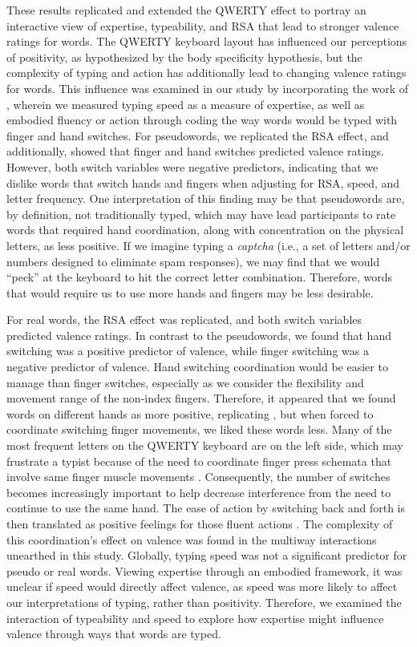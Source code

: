 \documentclass[english,man,man,mask]{apa6}
\theoremstyle{definition}
\theoremstyle{definition}
\theoremstyle{definition}
\theoremstyle{remark}
\begin{document}
These results replicated and extended the QWERTY effect to portray an
interactive view of expertise, typeability, and RSA that lead to
stronger valence ratings for words. The QWERTY keyboard layout has
influenced our perceptions of positivity, as hypothesized by the body
specificity hypothesis, but the complexity of typing and action has
additionally lead to changing valence ratings for words. This influence
was examined in our study by incorporating the work of
\textcite{Beilock2007}, wherein we measured typing speed as a measure of
expertise, as well as embodied fluency or action through coding the way
words would be typed with finger and hand switches. For pseudowords, we
replicated the RSA effect, and additionally, showed that finger and hand
switches predicted valence ratings. However, both switch variables were
negative predictors, indicating that we dislike words that switch hands
and fingers when adjusting for RSA, speed, and letter frequency. One
interpretation of this finding may be that pseudowords are, by
definition, not traditionally typed, which may have lead participants to
rate words that required hand coordination, along with concentration on
the physical letters, as less positive. If we imagine typing a
\emph{captcha} (i.e., a set of letters and/or numbers designed to
eliminate spam responses), we may find that we would \enquote{peck} at
the keyboard to hit the correct letter combination. Therefore, words
that would require us to use more hands and fingers may be less
desirable.

For real words, the RSA effect was replicated, and both switch variables
predicted valence ratings. In contrast to the pseudowords, we found that
hand switching was a positive predictor of valence, while finger
switching was a negative predictor of valence. Hand switching
coordination would be easier to manage than finger switches, especially
as we consider the flexibility and movement range of the non-index
fingers. Therefore, it appeared that we found words on different hands
as more positive, replicating \textcite{Beilock2007}, but when forced to
coordinate switching finger movements, we liked these words less. Many
of the most frequent letters on the QWERTY keyboard are on the left
side, which may frustrate a typist because of the need to coordinate
finger press schemata that involve same finger muscle movements
\autocite{Rumelhart1982}. Consequently, the number of switches becomes
increasingly important to help decrease interference from the need to
continue to use the same hand. The ease of action by switching back and
forth is then translated as positive feelings for those fluent actions
\autocite{Oppenheimer2008}. The complexity of this coordination's effect
on valence was found in the multiway interactions unearthed in this
study. Globally, typing speed was not a significant predictor for pseudo
or real words. Viewing expertise through an embodied framework, it was
unclear if speed would directly affect valence, as speed was more likely
to affect our interpretations of typing, rather than positivity.
Therefore, we examined the interaction of typeability and speed to
explore how expertise might influence valence through ways that words
are typed.
\end{document}
